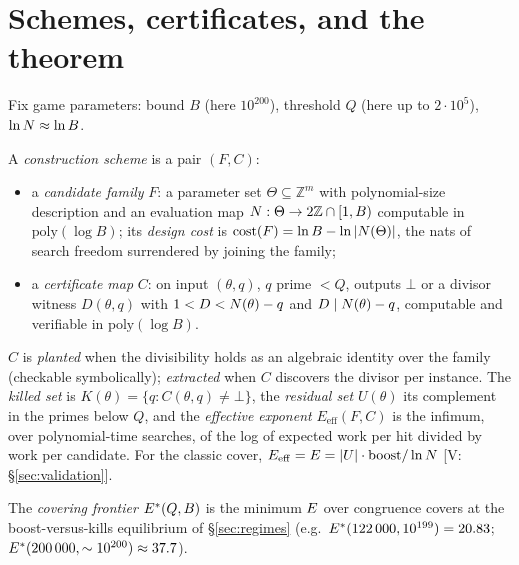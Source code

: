 \section{Schemes, certificates, and the theorem}\label{sec:formalism}

Fix game parameters: bound $B$ (here $10^{200}$), threshold $Q$ (here
up to $2\cdot10^5$), $\ln N\approx\ln B$.

\begin{definition}
A \emph{construction scheme} is a pair $(F,C)$:
\begin{itemize}
\item a \emph{candidate family} $F$: a parameter set
$\Theta\subseteq\mathbb Z^m$ with polynomial-size description and an
evaluation map $N:\Theta\to2\mathbb Z\cap[1,B)$ computable in
$\mathrm{poly}(\log B)$; its \emph{design cost} is
$\mathrm{cost}(F)=\ln B-\ln|N(\Theta)|$, the nats of search freedom
surrendered by joining the family;
\item a \emph{certificate map} $C$: on input $(\theta,q)$, $q$ prime
$<Q$, outputs $\bot$ or a divisor witness $D(\theta,q)$ with
$1<D<N(\theta)-q$ and $D\mid N(\theta)-q$, computable and verifiable
in $\mathrm{poly}(\log B)$.
\end{itemize}
$C$ is \emph{planted} when the divisibility holds as an algebraic
identity over the family (checkable symbolically); \emph{extracted}
when $C$ discovers the divisor per instance. The \emph{killed set} is
$K(\theta)=\{q:C(\theta,q)\ne\bot\}$, the \emph{residual set}
$U(\theta)$ its complement in the primes below $Q$, and the
\emph{effective exponent} $E_{\mathrm{eff}}(F,C)$ is the infimum, over
polynomial-time searches, of the log of expected work per hit divided
by work per candidate. For the classic cover,
$E_{\mathrm{eff}}=E=|U|\cdot\mathrm{boost}/\ln N$
[V: \S\ref{sec:validation}].
\end{definition}

The \emph{covering frontier} $E^*(Q,B)$ is the minimum $E$ over
congruence covers at the boost-versus-kills equilibrium of
\S\ref{sec:regimes} (e.g.\ $E^*(122\,000,10^{199})=20.83$;
$E^*(200\,000,\sim10^{200})\approx37.7$).

